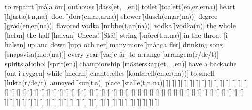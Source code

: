 \begin{questions}
\begin{multicols}{2}
        \question to repaint \f[måla om]
        \question outhouse \f[dass(et,\_,en)]
        \question toilet \f[toalett(en,er,erna)]
        \question heart \f[hjärta(t,n,na)]
        \question door \f[dörr(en,ar,arna)]
        \question shower \f[dusch(en,ar(na))]
        \question degree \f[grad(en,er(na))]
        \question flavored vodka \f[nubbe(t,ar(na))]
        \question vodka \f[vodka(n)]
        \question the whole \f[helan]
        \question the half \f[halvan]
        \question Cheers! \f[Skå!]
        \question string \f[snöre(t,n,na)]
        \question in the throat \f[i halsen]
        \question up and down \f[upp och ner]
        \question many more \f[många fler]
        \question drinking song \f[snapsvisa(n,or(na))]
        \question every year \f[varje år]
        \question to arrange \f[arrangera(r/de/t)]
        \question spirits,alcohol \f[sprit(en)]
        \question championship \f[mästerskap(et,\_,en)]
        \question have a backache \f[ont i ryggen]
        \question while \f[medan]
        \question chanterelles \f[kantarell(en,er(na))]
        \question to smell \f[lukta(r/de/t)]
        \question annoyed \f[sur(t,a)]
        \question place \f[ställe(t,n,na)]
        \question  \f[]
        \question  \f[]
        \question  \f[]
        \question  \f[]
        \question  \f[]
        \question  \f[]
        \question  \f[]
        \question  \f[]
        \question  \f[]
        \question  \f[]
        \question  \f[]
        \question  \f[]
        \question  \f[]
        \question  \f[]
        \question  \f[]
        \question  \f[]
        \question  \f[]
        \question  \f[]
        \question  \f[]
        \question  \f[]
        \question  \f[]
        \question  \f[]
        \question  \f[]
        \question  \f[]
        \question  \f[]
        \question  \f[]
        \question  \f[]
        \question  \f[]
        \question  \f[]
        \question  \f[]
        \question  \f[]
        \question  \f[]
        \question  \f[]
        \question  \f[]
        \question  \f[]
        \question  \f[]
        \question  \f[]
        \question  \f[]
        \question  \f[]
        \question  \f[]
        \question  \f[]
        \question  \f[]
        \question  \f[]
        \question  \f[]
        \question  \f[]
        \question  \f[]
        \question  \f[]
        \question  \f[]
        \question  \f[]
        \question  \f[]
        \question  \f[]
        \question  \f[]
        \question  \f[]
        \question  \f[]
        \question  \f[]
        \question  \f[]
        \question  \f[]
        \question  \f[]
        \question  \f[]
        \question  \f[]
        \question  \f[]
        \question  \f[]
        \question  \f[]
        \question  \f[]
        \question  \f[]
        \question  \f[]
        \question  \f[]
        \question  \f[]
        \question  \f[]
        \question  \f[]
        \question  \f[]
        \question  \f[]
        \question  \f[]
        \question  \f[]
        \question  \f[]
        \question  \f[]
        \question  \f[]
        \question  \f[]
        \question  \f[]
        \question  \f[]
    \end{multicols}
\end{questions}
